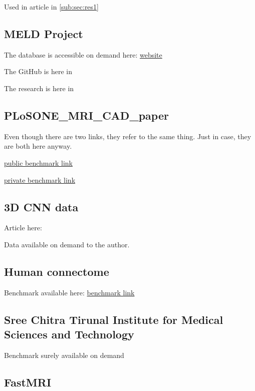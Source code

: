 Used in article in \ref{sub:sec:res1}

\subsection{MELD Project}

The database is accessible on demand here: \href{https://meldproject.github.io//}{website}

The GitHub is here in 

The research is here in 

\subsection{PLoSONE\_MRI\_CAD\_paper}

Even though there are two links, they refer to the same thing. Just in case, they are both here anyway.

\href{https://figshare.com/articles/journal_contribution/PLoSONE_MRI_CAD_paper/3573471?file=5653479}{public benchmark link}

\href{https://figshare.com/s/70178bc154bd83258322?file=5653479}{private benchmark link}

\subsection{3D CNN data}

Article here: 

Data available on demand to the author.

\subsection{Human connectome}

Benchmark available here: \href{https://www.humanconnectome.org/study/hcp-young-adult}{benchmark link}

\subsection{Sree Chitra Tirunal Institute for Medical Sciences and Technology}

Benchmark surely available on demand


\subsection{FastMRI}
\label{sub:sec:FastMRI}

